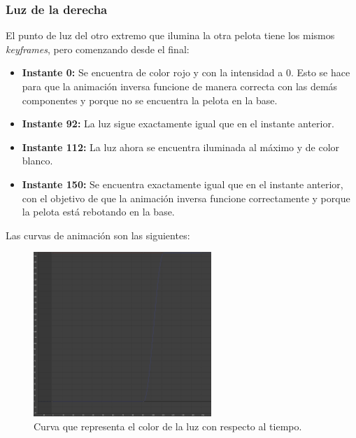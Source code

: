  \subsubsection{Luz de la derecha}

 El punto de luz del otro extremo que ilumina la otra pelota tiene los mismos \textit{keyframes}, pero comenzando desde el final:

 \begin{itemize}
    \item \textbf{Instante 0: }Se encuentra de color rojo y con la intensidad a 0. Esto se hace para que la animación inversa funcione de manera correcta con las demás componentes y porque no se encuentra la pelota en la base.
    \item \textbf{Instante 92: }La luz sigue exactamente igual que en el instante anterior.
    \item \textbf{Instante 112: }La luz ahora se encuentra iluminada al máximo y de color blanco.
    \item \textbf{Instante 150: }Se encuentra exactamente igual que en el instante anterior, con el objetivo de que la animación inversa funcione correctamente y porque la pelota está rebotando en la base.
 \end{itemize}
 
 \bigskip

Las curvas de animación son las siguientes:

\begin{figure}[H]
    \centering
    \includegraphics[width=0.6\textwidth]{imagenes/curvas/LR/filter.png}
    \caption{Curva que representa el color de la luz con respecto al tiempo.}
 \end{figure}

